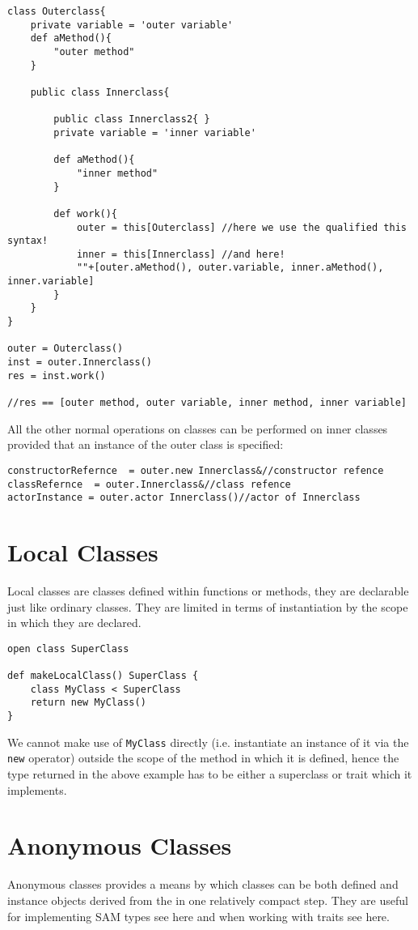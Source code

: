 \documentclass[conc-doc]{subfiles}
\begin{document}
\begin{lstlisting}
class Outerclass{
	private variable = 'outer variable'
	def aMethod(){
		"outer method"
	}
	
	public class Innerclass{
		
		public class Innerclass2{ }
		private variable = 'inner variable'
		
		def aMethod(){
			"inner method"
		}
		
		def work(){
			outer = this[Outerclass] //here we use the qualified this syntax!
			inner = this[Innerclass] //and here!
			""+[outer.aMethod(), outer.variable, inner.aMethod(), inner.variable]
		}
	}
}

outer = Outerclass()
inst = outer.Innerclass()
res = inst.work()

//res == [outer method, outer variable, inner method, inner variable]
\end{lstlisting}

All the other normal operations on classes can be performed on inner classes provided that an instance of the outer class is specified:
\begin{lstlisting}
constructorRefernce  = outer.new Innerclass&//constructor refence
classRefernce  = outer.Innerclass&//class refence
actorInstance = outer.actor Innerclass()//actor of Innerclass
\end{lstlisting}

\section{Local Classes}
Local classes are classes defined within functions or methods, they are declarable just like ordinary classes. They are limited in terms of instantiation by the scope in which they are declared.

\begin{lstlisting}
open class SuperClass

def makeLocalClass() SuperClass {
	class MyClass < SuperClass
	return new MyClass()
}
\end{lstlisting}

We cannot make use of \lstinline{MyClass} directly (i.e. instantiate an instance of it via the \lstinline{new} operator) outside the scope of the method in which it is defined, hence the type returned in the above example has to be either a superclass or trait which it implements.

\section{Anonymous Classes}
Anonymous classes provides a means by which classes can be both defined and instance objects derived from the in one relatively compact step. They are useful for implementing SAM types see here and when working with traits see here. 
\end{document}
